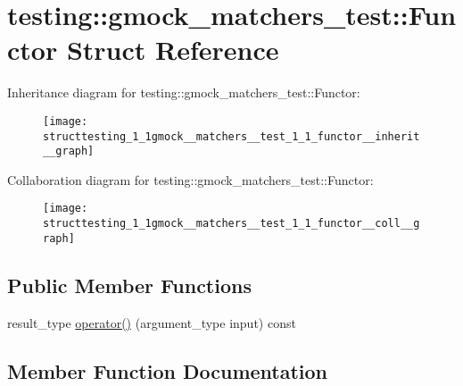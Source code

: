 \hypertarget{structtesting_1_1gmock__matchers__test_1_1_functor}{}\section{testing\+:\+:gmock\+\_\+matchers\+\_\+test\+:\+:Functor Struct Reference}
\label{structtesting_1_1gmock__matchers__test_1_1_functor}


Inheritance diagram for testing\+:\+:gmock\+\_\+matchers\+\_\+test\+:\+:Functor\+:
\nopagebreak
\begin{figure}[H]
\begin{center}
\leavevmode
\texttt{[image: structtesting\_1\_1gmock\_\_matchers\_\_test\_1\_1\_functor\_\_inherit\_\_graph]}
\end{center}
\end{figure}


Collaboration diagram for testing\+:\+:gmock\+\_\+matchers\+\_\+test\+:\+:Functor\+:
\nopagebreak
\begin{figure}[H]
\begin{center}
\leavevmode
\texttt{[image: structtesting\_1\_1gmock\_\_matchers\_\_test\_1\_1\_functor\_\_coll\_\_graph]}
\end{center}
\end{figure}
\subsection*{Public Member Functions}
\begin{DoxyCompactItemize}
\item 
result\+\_\+type \hyperlink{structtesting_1_1gmock__matchers__test_1_1_functor_abbcfb13bd30c93bdd08e2ad3f8c5024f}{operator()} (argument\+\_\+type input) const 
\end{DoxyCompactItemize}


\subsection{Member Function Documentation}
